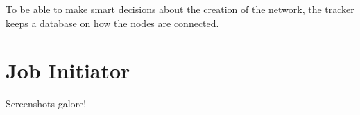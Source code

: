 To be able to make smart decisions about the creation of the network, the tracker keeps a database on how the nodes are connected.

\section{Job Initiator}
Screenshots galore!
